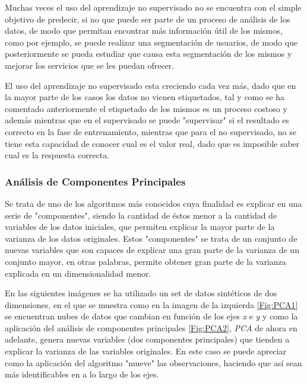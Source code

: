 Muchas veces el uso del aprendizaje no supervisado no se encuentra con el simple objetivo de predecir, si no que puede ser parte de un proceso de análisis de los datos, de modo que permitan encontrar más información útil de los mismos, como por ejemplo, se puede realizar una segmentación de usuarios, de modo que posteriormente se pueda estudiar que causa esta segmentación de los mismos y mejorar los servicios que se les puedan ofrecer.

El uso del aprendizaje no supervisado esta creciendo cada vez más, dado que en la mayor parte de los casos los datos no vienen etiquetados, tal y como se ha comentado anteriormente el etiquetado de los mismos es un proceso costoso y además mientras que en el supervisado se puede "supervisar" si el resultado es correcto en la fase de entrenamiento, mientras que para el no supervisado, no se tiene esta capacidad de conocer cual es el valor real, dado que es imposible saber cual es la respuesta correcta.
\subsubsection{Análisis de Componentes Principales}
Se trata de uno de los algoritmos más conocidos cuya finalidad es explicar en una serie de "componentes", siendo la cantidad de éstos menor a la cantidad de variables de los datos iniciales, que permiten explicar la mayor parte de la varianza de los datos originales. Estos "componentes" se trata de un conjunto de nuevas variables que son capaces de explicar una gran parte de la varianza de un conjunto mayor, en otras palabras, permite obtener gran parte de la varianza explicada en un dimensionalidad menor.

En las siguientes imágenes se ha utilizado un set de datos sintéticos de dos dimensiones, en el que se muestra como en la imagen de la izquierda \ref{Fig:PCA1} se encuentran nubes de datos que cambian en función de los ejes \textit{x} e \textit{y} y como la aplicación del análisis de componentes principales \ref{Fig:PCA2}, \textit{PCA} de ahora en adelante, genera nuevas variables (dos componentes principales) que tienden a explicar la varianza de las variables originales. En este caso se puede apreciar como la aplicación del algoritmo "mueve" las observaciones, haciendo que así sean más identificables en a lo largo de los ejes.

